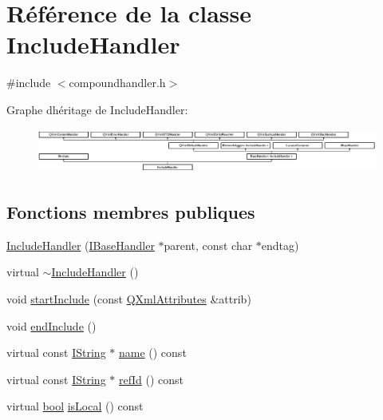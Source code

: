 \hypertarget{class_include_handler}{}\section{Référence de la classe Include\+Handler}
\label{class_include_handler}


{\ttfamily \#include $<$compoundhandler.\+h$>$}

Graphe d\textquotesingle{}héritage de Include\+Handler\+:\begin{figure}[H]
\begin{center}
\leavevmode
\includegraphics[height=1.467890cm]{class_include_handler}
\end{center}
\end{figure}
\subsection*{Fonctions membres publiques}
\begin{DoxyCompactItemize}
\item 
\hyperlink{class_include_handler_af6007f1851b6179181f54adab957dc6b}{Include\+Handler} (\hyperlink{class_i_base_handler}{I\+Base\+Handler} $\ast$parent, const char $\ast$endtag)
\item 
virtual \hyperlink{class_include_handler_a8a855195d27851165112e3ed26b30282}{$\sim$\+Include\+Handler} ()
\item 
void \hyperlink{class_include_handler_a9f302d0dc58cf30352e206c5a799fa5e}{start\+Include} (const \hyperlink{class_q_xml_attributes}{Q\+Xml\+Attributes} \&attrib)
\item 
void \hyperlink{class_include_handler_aba7e0fa869808eb5b7a418235c1be335}{end\+Include} ()
\item 
virtual const \hyperlink{class_i_string}{I\+String} $\ast$ \hyperlink{class_include_handler_a78b9de61d489e1d65ade096614fc0d45}{name} () const 
\item 
virtual const \hyperlink{class_i_string}{I\+String} $\ast$ \hyperlink{class_include_handler_ad195a72595b89b9055d492a0aeee93f7}{ref\+Id} () const 
\item 
virtual \hyperlink{qglobal_8h_a1062901a7428fdd9c7f180f5e01ea056}{bool} \hyperlink{class_include_handler_a0b45ab50453c30cdf7abed7fa8523e4b}{is\+Local} () const 
\end{DoxyCompactItemize}
